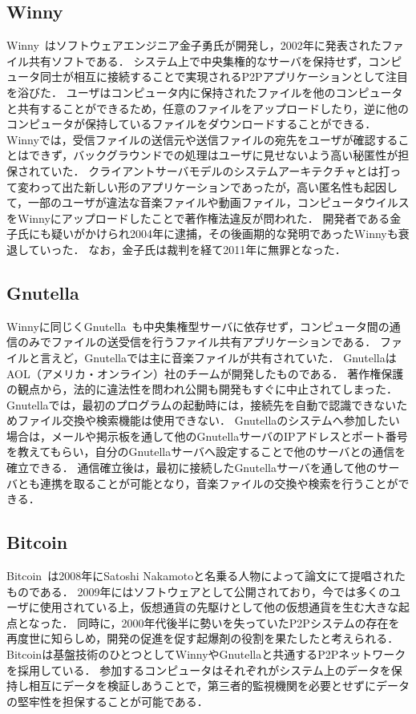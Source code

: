 \subsection{Winny}

Winny~\cite{Winny}はソフトウェアエンジニア金子勇氏が開発し，2002年に発表されたファイル共有ソフトである．
システム上で中央集権的なサーバを保持せず，コンピュータ同士が相互に接続することで実現されるP2Pアプリケーションとして注目を浴びた．
ユーザはコンピュータ内に保持されたファイルを他のコンピュータと共有することができるため，任意のファイルをアップロードしたり，逆に他のコンピュータが保持しているファイルをダウンロードすることができる．
Winnyでは，受信ファイルの送信元や送信ファイルの宛先をユーザが確認することはできず，バックグラウンドでの処理はユーザに見せないよう高い秘匿性が担保されていた．
クライアントサーバモデルのシステムアーキテクチャとは打って変わって出た新しい形のアプリケーションであったが，高い匿名性も起因して，一部のユーザが違法な音楽ファイルや動画ファイル，コンピュータウイルスをWinnyにアップロードしたことで著作権法違反が問われた．
開発者である金子氏にも疑いがかけられ2004年に逮捕，その後画期的な発明であったWinnyも衰退していった．
なお，金子氏は裁判を経て2011年に無罪となった．

\subsection{Gnutella}

Winnyに同じくGnutella~\cite{Gnutella}も中央集権型サーバに依存せず，コンピュータ間の通信のみでファイルの送受信を行うファイル共有アプリケーションである．
ファイルと言えど，Gnutellaでは主に音楽ファイルが共有されていた．
GnutellaはAOL（アメリカ・オンライン）社のチームが開発したものである．
著作権保護の観点から，法的に違法性を問われ公開も開発もすぐに中止されてしまった．
Gnutellaでは，最初のプログラムの起動時には，接続先を自動で認識できないためファイル交換や検索機能は使用できない．
Gnutellaのシステムへ参加したい場合は，メールや掲示板を通して他のGnutellaサーバのIPアドレスとポート番号を教えてもらい，自分のGnutellaサーバへ設定することで他のサーバとの通信を確立できる．
通信確立後は，最初に接続したGnutellaサーバを通して他のサーバとも連携を取ることが可能となり，音楽ファイルの交換や検索を行うことができる．

\subsection{Bitcoin}

Bitcoin~\cite{Bitcoin}は2008年にSatoshi Nakamotoと名乗る人物によって論文にて提唱されたものである．
2009年にはソフトウェアとして公開されており，今では多くのユーザに使用されている上，仮想通貨の先駆けとして他の仮想通貨を生む大きな起点となった．
同時に，2000年代後半に勢いを失っていたP2Pシステムの存在を再度世に知らしめ，開発の促進を促す起爆剤の役割を果たしたと考えられる．
Bitcoinは基盤技術のひとつとしてWinnyやGnutellaと共通するP2Pネットワークを採用している．
参加するコンピュータはそれぞれがシステム上のデータを保持し相互にデータを検証しあうことで，第三者的監視機関を必要とせずにデータの堅牢性を担保することが可能である．

